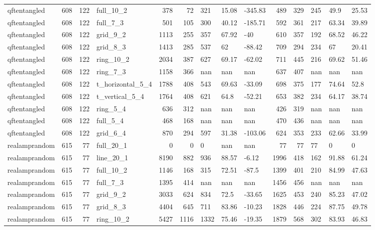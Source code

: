 \begin{longtable}{lrrlrrlllrrlll}
qftentangled & 608 & 122 & full\_10\_2 & 378 & 72 & 321 & 15.08 & -345.83 & 489 & 329 & 245 & 49.9 & 25.53 \\
qftentangled & 608 & 122 & full\_7\_3 & 501 & 105 & 300 & 40.12 & -185.71 & 592 & 361 & 217 & 63.34 & 39.89 \\
qftentangled & 608 & 122 & grid\_9\_2 & 1113 & 255 & 357 & 67.92 & -40 & 610 & 357 & 192 & 68.52 & 46.22 \\
qftentangled & 608 & 122 & grid\_8\_3 & 1413 & 285 & 537 & 62 & -88.42 & 709 & 294 & 234 & 67 & 20.41 \\
qftentangled & 608 & 122 & ring\_10\_2 & 2034 & 387 & 627 & 69.17 & -62.02 & 711 & 445 & 216 & 69.62 & 51.46 \\
qftentangled & 608 & 122 & ring\_7\_3 & 1158 & 366 & nan & nan & nan & 637 & 407 & nan & nan & nan \\
qftentangled & 608 & 122 & t\_horizontal\_5\_4 & 1788 & 408 & 543 & 69.63 & -33.09 & 698 & 375 & 177 & 74.64 & 52.8 \\
qftentangled & 608 & 122 & t\_vertical\_5\_4 & 1764 & 408 & 621 & 64.8 & -52.21 & 653 & 382 & 234 & 64.17 & 38.74 \\
qftentangled & 608 & 122 & ring\_5\_4 & 636 & 312 & nan & nan & nan & 426 & 319 & nan & nan & nan \\
qftentangled & 608 & 122 & full\_5\_4 & 468 & 168 & nan & nan & nan & 470 & 436 & nan & nan & nan \\
qftentangled & 608 & 122 & grid\_6\_4 & 870 & 294 & 597 & 31.38 & -103.06 & 624 & 353 & 233 & 62.66 & 33.99 \\
realamprandom & 615 & 77 & full\_20\_1 & 0 & 0 & 0 & nan & nan & 77 & 77 & 77 & 0 & 0 \\
realamprandom & 615 & 77 & line\_20\_1 & 8190 & 882 & 936 & 88.57 & -6.12 & 1996 & 418 & 162 & 91.88 & 61.24 \\
realamprandom & 615 & 77 & full\_10\_2 & 1146 & 168 & 315 & 72.51 & -87.5 & 1399 & 401 & 210 & 84.99 & 47.63 \\
realamprandom & 615 & 77 & full\_7\_3 & 1395 & 414 & nan & nan & nan & 1456 & 456 & nan & nan & nan \\
realamprandom & 615 & 77 & grid\_9\_2 & 3033 & 624 & 834 & 72.5 & -33.65 & 1625 & 453 & 240 & 85.23 & 47.02 \\
realamprandom & 615 & 77 & grid\_8\_3 & 4404 & 645 & 711 & 83.86 & -10.23 & 1828 & 446 & 224 & 87.75 & 49.78 \\
realamprandom & 615 & 77 & ring\_10\_2 & 5427 & 1116 & 1332 & 75.46 & -19.35 & 1879 & 568 & 302 & 83.93 & 46.83 \\

\end{longtable}

